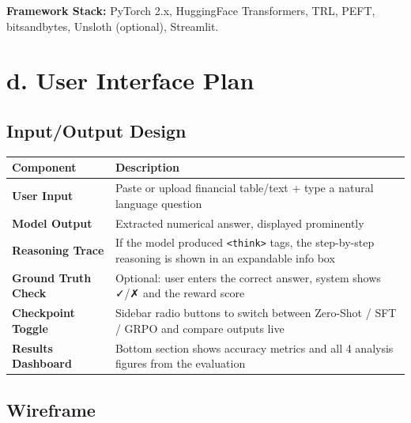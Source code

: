 \documentclass[10pt]{article}
\begin{document}
\textbf{Framework Stack:} PyTorch 2.x, HuggingFace Transformers, TRL, PEFT, bitsandbytes, Unsloth (optional), Streamlit.

\section{d. User Interface Plan}

\subsection{Input/Output Design}

\begin{tabularx}{\textwidth}{@{}lX@{}}
\toprule
\textbf{Component} & \textbf{Description} \\
\midrule
\textbf{User Input} & Paste or upload financial table/text + type a natural language question \\
\textbf{Model Output} & Extracted numerical answer, displayed prominently \\
\textbf{Reasoning Trace} & If the model produced \texttt{<think>} tags, the step-by-step reasoning is shown in an expandable info box \\
\textbf{Ground Truth Check} & Optional: user enters the correct answer, system shows ✓/✗ and the reward score \\
\textbf{Checkpoint Toggle} & Sidebar radio buttons to switch between Zero-Shot / SFT / GRPO and compare outputs live \\
\textbf{Results Dashboard} & Bottom section shows accuracy metrics and all 4 analysis figures from the evaluation \\
\bottomrule
\end{tabularx}

\subsection{Wireframe}
\end{document}
